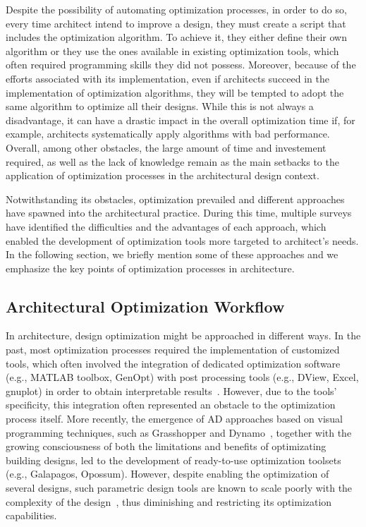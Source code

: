 Despite the possibility of automating optimization processes, in order to do so, every time architect intend to improve a design, they must create a script that includes the optimization algorithm. To achieve it, they either define their own algorithm or they use the ones available in existing optimization tools, which often required programming skills they did not possess. Moreover, because of the efforts associated with its implementation, even if architects succeed in the implementation of optimization algorithms, they will be tempted to adopt the same algorithm to optimize all their designs. While this is not always a disadvantage, it can have a drastic impact in the overall optimization time if, for example, architects systematically apply algorithms with bad performance.
Overall, among other obstacles, the large amount of time and investement required, as well as the lack of knowledge remain as the main setbacks to the application of optimization processes in the architectural design context. 

Notwithstanding its obstacles, optimization prevailed and different approaches have spawned into the architectural practice. During this time, 
multiple surveys have identified the difficulties and the advantages of each approach, which enabled the development of optimization tools more targeted to architect's needs. In the following section, we briefly mention some of these approaches and we emphasize the key points of optimization processes in architecture.
	
\subsection{Architectural Optimization Workflow}
	
In architecture, design optimization might be approached in different ways. In the past, most optimization processes required the implementation of customized tools, which often involved the integration of dedicated optimization software (e.g., MATLAB toolbox, GenOpt) with post processing tools (e.g., DView, Excel, gnuplot) in order to obtain interpretable results~\cite{Attia2013}.  However, due to the tools' specificity, this integration often represented an obstacle to the optimization process itself. More recently, the emergence of \ac{AD} approaches based on visual programming techniques, such as Grasshopper and Dynamo~\cite{GRASSHOPPER,DYNAMOBIM}, together with the growing consciousness of both the limitations and benefits of optimizating building designs, led to the development of ready-to-use optimization toolsets (e.g., Galapagos, Opossum). However, despite enabling the optimization of several designs, such parametric design tools are known to scale poorly with the complexity of the design~\cite{Heijden2015}, thus diminishing and restricting its optimization capabilities. 

